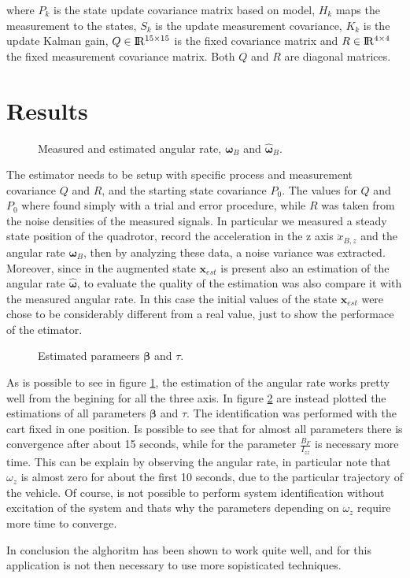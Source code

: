 \noindent where $P_k$ is the state update covariance matrix based on model, $H_k$ maps the measurement to the states, $S_k$ is the update measurement covariance, $K_k$ is the update Kalman gain, $Q\in\rm I\!R^{15\times 15}$ is the fixed covariance matrix and $R\in\rm I\!R^{4\times 4}$ the fixed measurement covariance matrix. Both $Q$ and $R$ are diagonal matrices.


\section{Results}
\label{resultsKalman}

\begin{figure}[h]
	\centering
 	
 	\caption{Measured and estimated angular rate, $\boldsymbol{\omega}_B$ and $\hat{\boldsymbol{\omega}}_B$.}
 	\label{fig:omegaKalman}		
\end{figure}

\noindent The estimator needs to be setup with specific process and measurement covariance $Q$ and $R$, and the starting state covariance $P_0$. The values for $Q$ and $P_0$ where found simply with a trial and error procedure, while $R$ was taken from the noise densities of the measured signals. In particular we measured a steady state position of the quadrotor, record the acceleration in the z axis $\ddot{x}_{B,z}$ and the angular rate $\boldsymbol{\omega}_B$, then by analyzing these data, a noise variance was extracted. Moreover, since in the augmented state $\mathbf{x}_{est}$ is present also an estimation of the angular rate $\hat{\boldsymbol{\omega}}$, to evaluate the quality of the estimation was also compare it with the measured angular rate. In this case the initial values of the state $\mathbf{x}_{est}$ were chose to be considerably different from a real value, just to show the performace of the etimator.

\begin{figure}[h]
	\centering
	
	
	\caption{Estimated parameers $\boldsymbol{\beta}$ and $\tau$.}
	\label{fig:betaTauKalman}
\end{figure}

\noindent As is possible to see in figure \ref{fig:omegaKalman}, the estimation of the angular rate works pretty well from the begining for all the three axis. In figure \ref{fig:betaTauKalman} are instead plotted the estimations of all parameters $\boldsymbol{\beta}$ and $\tau$. The identification was performed with the cart fixed in one position. Is possible to see that for almost all parameters there is convergence after about 15 seconds, while for the parameter $\frac{B_F}{I_{zz}}$ is necessary more time. This can be explain by observing the angular rate, in particular note that $\omega_z$ is almost zero for about the first 10 seconds, due to the particular trajectory of the vehicle. Of course, is not possible to perform system identification without excitation of the system and thats why the parameters depending on $\omega_z$ require more time to converge.

\noindent In conclusion the alghoritm has been shown to work quite well, and for this application is not then necessary to use more sopisticated techniques.
